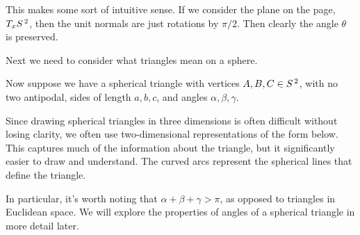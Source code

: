 This makes some sort of intuitive sense. If we consider the plane on the page, $T_{x} S^{\,2}$, then the unit normals are just rotations by $\pi/2$. Then clearly the angle $\theta$ is preserved.


	\pagebreak

Next we need to consider what triangles mean on a sphere.

Now suppose we have a spherical triangle with vertices $A,B,C\in S^{\,2}$, with no two antipodal, sides of length $a,b,c$, and angles $\alpha,\beta,\gamma$.

Since drawing spherical triangles in three dimensions is often difficult without losing clarity, we often use two-dimensional representations of the form below. This captures much of the information about the triangle, but it significantly easier to draw and understand. The curved arcs represent the spherical lines that define the triangle.

\begin{center}
\end{center}

In particular, it's worth noting that $\alpha+\beta+\gamma>\pi$, as opposed to triangles in Euclidean space. We will explore the properties of angles of a spherical triangle in more detail later.


